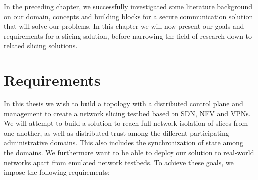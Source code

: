 

In the preceding chapter, we successfully investigated some literature background on our domain, concepts and building blocks for a secure communication solution that will solve our problems. In this chapter we will now present our goals and requirements for a slicing solution, before narrowing the field of research down to related slicing solutions.


\section{Requirements}
\label{related_work_requirements}
In this thesis we wish to build a topology with a distributed control plane and management to create a network slicing testbed based on SDN, NFV and VPNs. We will attempt to build a solution to reach full network isolation of slices from one another, as well as distributed trust among the different participating administrative domains. This also includes the synchronization of state among the domains. We furthermore want to be able to deploy our solution to real-world networks apart from emulated network testbeds.
To achieve these goals, we impose the following requirements:

